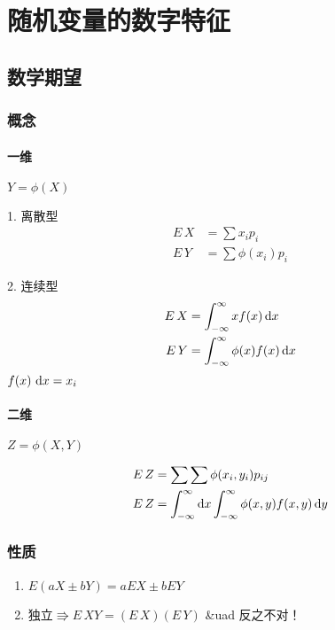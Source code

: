 \chapter{随机变量的数字特征}

\section{数学期望}
\label{sec:数学期望}

\subsection{概念}
\label{sub:概念}

\subsubsection{一维}
\label{ssub:一维}

$ Y = \phi(X) $

1. 离散型
\[
    \begin{aligned}
        E\,X &= \sum x_i p_i \\
        E\,Y &= \sum \phi(x_i) p_i
    \end{aligned}
\]

2. 连续型
\[
    \begin{aligned}
        E\,X &= \int_{-\infty}^{\infty} x f(x) \dif x \\
        E\,Y &= \int_{-\infty}^{\infty} \phi(x) f(x) \dif x
    \end{aligned}
\]
$f(x)\, \dif x = x_i$

\subsubsection{二维}
\label{ssub:二维}

$Z = \phi(X, Y)$

\[
    \begin{aligned}
        E\,Z &= \sum \sum \phi(x_i, y_i)  p_{ij} \\
        E\,Z &= \int_{-\infty}^{\infty} \dif x \int_{-\infty}^{\infty}\phi(x,y) f(x,y) \dif y
    \end{aligned}
\]

\subsection{性质}
\label{sub:性质}

\begin{enumerate}
    \item $E(aX \pm bY) = aEX \pm bEY$
    \item $\text{独立} \Rrightarrow E\,XY = (E\,X) (E\,Y)$ \&uad 反之不对！
\end{enumerate}

